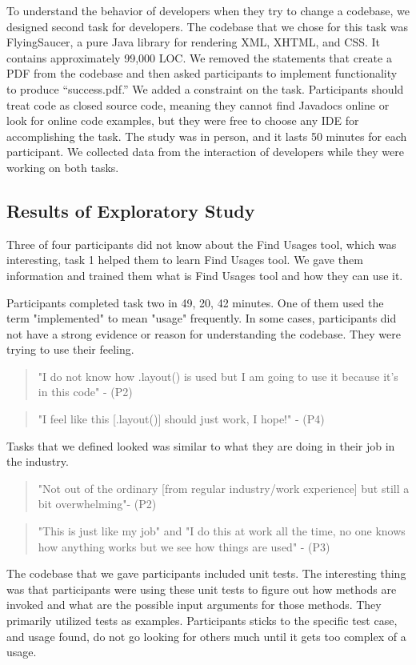 \documentclass[conference]{IEEEtran}
\begin{document}
To understand the behavior of developers when they try to change a codebase, we designed second task for developers. The codebase that we chose for this task was FlyingSaucer, a pure Java library for rendering XML, XHTML, and CSS. It contains approximately 99,000 LOC. We removed the statements that create a PDF from the codebase and then asked participants to implement functionality to produce “success.pdf.” We added a constraint on the task. Participants should treat code as closed source code, meaning they cannot find Javadocs online or look for online code examples, but they were free to choose any IDE for accomplishing the task. The study was in person, and it lasts 50 minutes for each participant. 
We collected data from the interaction of developers while they were working on both tasks. 

\subsection{Results of Exploratory Study}

Three of four participants did not know about the Find Usages tool, which was interesting, task 1 helped them to learn Find Usages tool. We gave them information and trained them what is Find Usages tool and how they can use it.\par

Participants completed task two in 49, 20, 42 minutes. One of them used the term "implemented" to mean "usage" frequently. In some cases, participants did not have a strong evidence or reason for understanding the codebase. They were trying to use their feeling. 
\begin{quote}"I do not know how .layout() is used but I am going to use it because it's in this code" - (P2) \end{quote}
\begin{quote}"I feel like this [.layout()] should just work, I hope!" - (P4) \end{quote}

Tasks that we defined looked was similar to what they are doing in their job in the industry. 
\begin{quote}
"Not out of the ordinary [from regular industry/work experience] but still a bit overwhelming"- (P2)
\end{quote}
\begin{quote} "This is just like my job" and "I do this at work all the time, no one knows how anything works but we see how things are used"
- (P3)
\end{quote}
The codebase that we gave participants included unit tests. The interesting thing was that participants were using these unit tests to figure out how methods are invoked and what are the possible input arguments for those methods. They primarily utilized tests as examples. Participants sticks to the specific test case, and usage found, do not go looking for others much until it gets too complex of a usage.
\end{document}
